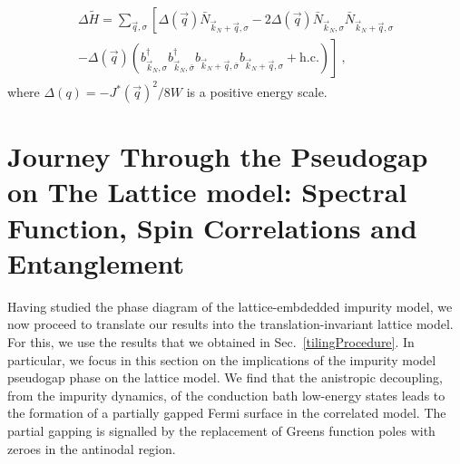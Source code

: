 \documentclass[reprint,hidelinks,onecolumn]{revtex4-2}
\begin{document}
\begin{equation}\begin{aligned}
	\Delta \tilde H = \sum_{\vec q,\sigma}\left[\Delta(\vec q)\bar N_{\vec k_N + \vec q, \sigma} -2\Delta(\vec q)\bar N_{\vec k_N, \sigma}\bar N_{\vec k_N + \vec q, \sigma}\right.\\
	\left. -\Delta(\vec q) \left(b^\dagger_{\vec k_N, \sigma} b^\dagger_{\vec k_N, \bar\sigma} b_{\vec k_N + \vec q, \bar\sigma}b_{\vec k_N + \vec q, \sigma} + \text{h.c.}\right) \right]~,
\end{aligned}\end{equation}
where \(\Delta(q) = -{J^*(\vec q)}^2/8W\) is a positive energy scale.

\section{Journey Through the Pseudogap on The Lattice model: Spectral Function, Spin Correlations and Entanglement}
Having studied the phase diagram of the lattice-embdedded impurity model, we now proceed to translate our results into the translation-invariant lattice model. For this, we use the results that we obtained in Sec.~\ref{tilingProcedure}. In particular, we focus in this section on the implications of the impurity model pseudogap phase on the lattice model. We find that the anistropic decoupling, from the impurity dynamics, of the conduction bath low-energy states leads to the formation of a partially gapped Fermi surface in the correlated model. The partial gapping is signalled by the replacement of Greens function poles with zeroes in the antinodal region.
\end{document}
